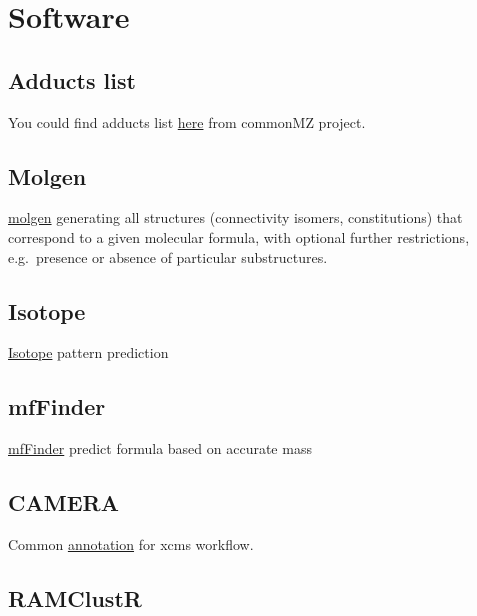 \documentclass[
]{book}
\begin{document}
\hypertarget{software-3}{%
\section{Software}\label{software-3}}

\hypertarget{adducts-list}{%
\subsection{Adducts list}\label{adducts-list}}

You could find adducts list \href{https://github.com/stanstrup/commonMZ}{here} from commonMZ project.

\hypertarget{molgen}{%
\subsection{Molgen}\label{molgen}}

\href{http://molgen.de}{molgen} generating all structures (connectivity isomers, constitutions) that correspond to a given molecular formula, with optional further restrictions, e.g.~presence or absence of particular substructures.

\hypertarget{isotope}{%
\subsection{Isotope}\label{isotope}}

\href{https://www.envipat.eawag.ch/index.php}{Isotope} pattern prediction

\hypertarget{mffinder}{%
\subsection{mfFinder}\label{mffinder}}

\href{http://www.chemcalc.org/mf_finder/mfFinder_em_new}{mfFinder} predict formula based on accurate mass

\hypertarget{camera}{%
\subsection{CAMERA}\label{camera}}

Common \href{https://bioconductor.org/packages/release/bioc/html/CAMERA.html}{annotation} for xcms workflow\citep{kuhl2012}.

\hypertarget{ramclustr}{%
\subsection{RAMClustR}\label{ramclustr}}
\end{document}

